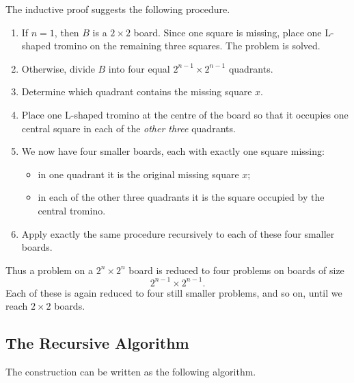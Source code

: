 \documentclass[12pt]{article}
\begin{document}
The inductive proof suggests the following procedure.

\begin{enumerate}

\item If $n=1$, then $B$ is a $2\times2$ board. Since one square is
missing, place one L-shaped tromino on the remaining three squares.
The problem is solved.

\item Otherwise, divide $B$ into four equal
$2^{n-1}\times2^{n-1}$ quadrants.

\item Determine which quadrant contains the missing square $x$.

\item Place one L-shaped tromino at the centre of the board so that
it occupies one central square in each of the \emph{other three}
quadrants.

\item We now have four smaller boards, each with exactly one square
missing:
\begin{itemize}
    \item in one quadrant it is the original missing square $x$;
    \item in each of the other three quadrants it is the square
          occupied by the central tromino.
\end{itemize}

\item Apply exactly the same procedure recursively to each of these
four smaller boards.

\end{enumerate}

Thus a problem on a $2^n\times2^n$ board is reduced to four problems
on boards of size
\[
        2^{n-1}\times2^{n-1}.
\]
Each of these is again reduced to four still smaller problems, and so
on, until we reach $2\times2$ boards.


\subsection{The Recursive Algorithm}

The construction can be written as the following algorithm.
\end{document}
